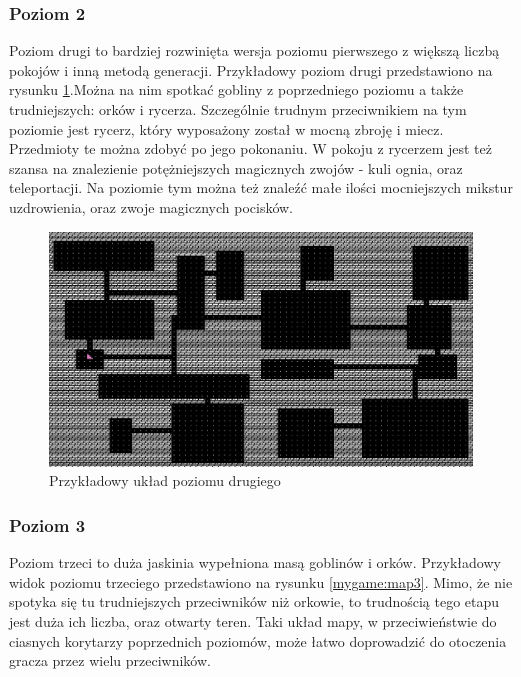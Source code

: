 \documentclass[12pt,twoside]{article}
\begin{document}
\subsubsection{Poziom 2}
Poziom drugi to bardziej rozwinięta wersja poziomu pierwszego z większą liczbą pokojów i inną metodą generacji. Przykładowy poziom drugi przedstawiono na rysunku \ref{mygame:map2}.Można na nim spotkać gobliny z poprzedniego poziomu a także trudniejszych: orków i rycerza. Szczególnie trudnym przeciwnikiem na tym poziomie jest rycerz, który wyposażony został w mocną zbroję i miecz. Przedmioty te można zdobyć  po jego pokonaniu. W pokoju z rycerzem jest też szansa na znalezienie potężniejszych magicznych zwojów - kuli ognia, oraz  teleportacji. Na poziomie tym można też znaleźć małe ilości mocniejszych mikstur uzdrowienia, oraz zwoje magicznych pocisków.


\FloatBarrier
\begin{figure}[ht]
	\centering
	\includegraphics[width=14cm]{images/mygame/map2.png}
	\caption{Przykładowy układ poziomu drugiego}
	\label{mygame:map2}
\end{figure}
\FloatBarrier


\subsubsection{Poziom 3}
Poziom trzeci to duża jaskinia wypełniona masą goblinów i orków. Przykładowy widok poziomu trzeciego przedstawiono na rysunku \ref{mygame:map3}. Mimo, że nie spotyka się tu trudniejszych przeciwników niż orkowie, to trudnością tego etapu jest duża ich liczba, oraz otwarty teren. Taki układ mapy, w przeciwieństwie do ciasnych korytarzy poprzednich poziomów, może łatwo doprowadzić do otoczenia gracza przez wielu przeciwników.
\end{document}
